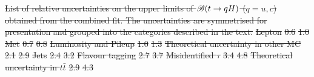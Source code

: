 \documentclass[PAPER, coverpage, atlasdraft=true, texlive=2016, UKenglish]{\ATLASLATEXPATH atlasdoc}
\providecommand{\DIFdel}[1]{{\protect\color{red}\sout{#1}}}                      %
\providecommand{\DIFdelbegin}{} %
\providecommand{\DIFdelFL}[1]{\DIFdel{#1}} %
\begin{document}
\DIFdelbegin %
{%
\DIFdelFL{List of relative uncertainties on the upper limits of $\mathscr{B}(t\to qH)$ ($q=u,c$) obtained from the combined fit. The uncertainties are symmetrised for presentation and grouped into the categories described in the text.}}
\DIFdelFL{Lepton                                  }%
\DIFdelFL{0.6           }%
\DIFdelFL{1.0         }%
\DIFdelFL{Met                                     }%
\DIFdelFL{0.7           }%
\DIFdelFL{0.8         }%
\DIFdelFL{Luminosity and Pileup                   }%
\DIFdelFL{1.0           }%
\DIFdelFL{1.3         }%
\DIFdelFL{Theoretical uncertainty in other MC     }%
\DIFdelFL{2.1           }%
\DIFdelFL{2.9         }%
\DIFdelFL{Jets                                    }%
\DIFdelFL{2.4           }%
\DIFdelFL{3.2         }%
\DIFdelFL{Flavour tagging                         }%
\DIFdelFL{2.7           }%
\DIFdelFL{3.7         }%
\DIFdelFL{Misidentified $\tau$                    }%
\DIFdelFL{3.4           }%
\DIFdelFL{4.8         }%
\DIFdelFL{Theoretical uncertainty in $t\bar{t}$   }%
\DIFdelFL{2.9           }%
\DIFdelFL{4.3         }%
\end{document}
